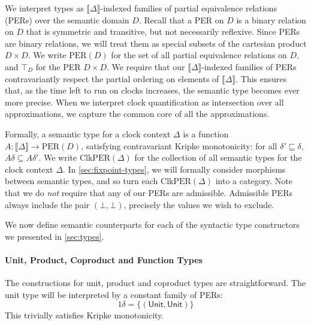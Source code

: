 \documentclass[natbib]{sigplanconf}
\newcommand{\clkSem}[1]{\llbracket #1 \rrbracket}
\newcommand{\ClkPER}{\mathrm{ClkPER}}
\newcommand{\PER}{\mathrm{PER}}
\newcommand{\semCons}[1]{\mathsf{#1}}
\begin{document}
We interpret types as $\clkSem\Delta$-indexed families of partial
equivalence relations (PERs) over the semantic domain $D$. Recall that
a PER on $D$ is a binary relation on $D$ that is symmetric and
transitive, but not necessarily reflexive. Since PERs are binary
relations, we will treat them as special subsets of the cartesian
product $D \times D$. We write $\PER(D)$ for the set of all partial
equivalence relations on $D$, and $\top_D$ for the PER $D \times D$.
We require that our $\clkSem\Delta$-indexed families of PERs
contravariantly respect the partial ordering on elements of
$\clkSem\Delta$. This ensures that, as the time left to run on clocks
increases, the semantic type becomes ever more precise. When we
interpret clock quantification as intersection over all
approximations, we capture the common core of all the approximations.

Formally, a semantic type for a clock context $\Delta$ is a function
$A : \clkSem\Delta \to \PER(D)$, satisfying contravariant Kripke
monotonicity: for all $\delta' \sqsubseteq \delta$, $A\delta \subseteq
A\delta'$. We write $\ClkPER(\Delta)$ for the collection of all
semantic types for the clock context $\Delta$. In
\autoref{sec:fixpoint-types}, we will formally consider morphisms
between semantic types, and so turn each $\ClkPER(\Delta)$ into a
category. Note that we do \emph{not} require that any of our PERs are
admissible. Admissible PERs always include the pair $(\bot,\bot)$,
precisely the values we wish to exclude.

We now define semantic counterparts for each of the syntactic type
constructors we presented in \autoref{sec:types}.

\paragraph{Unit, Product, Coproduct and Function Types}

The constructions for unit, product and coproduct types are
straightforward. The unit type will be interpreted by a constant
family of PERs:
\begin{displaymath}
  1\delta = \{(\semCons{Unit}, \semCons{Unit})\}
\end{displaymath}
This trivially satisfies Kripke monotonicity.
\end{document}
